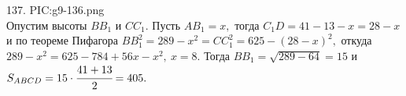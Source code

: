 137. {{PIC:g9-136.png}}\\
Опустим высоты $BB_1$ и $CC_1.$ Пусть $AB_1=x,$ тогда $C_1D=41-13-x=28-x$ и по теореме Пифагора $BB_1^2=289-x^2=CC_1^2=625-(28-x)^2,$ откуда
$289-x^2=625-784+56x-x^2,\ x=8.$ Тогда $BB_1=\sqrt{289-64}=15$ и $S_{ABCD}=15\cdot\cfrac{41+13}{2}=405.$\\
